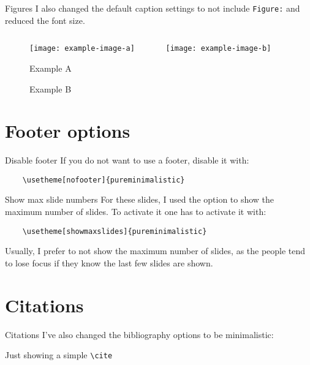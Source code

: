 \documentclass[aspectratio=169]{beamer}
\begin{document}
\begin{frame}{Figures}
  I also changed the default caption settings to not 
  include \texttt{Figure:} and reduced the font size.
    \begin{figure}[H]
        \centering
        \begin{columns}[T]
            \begin{column}{.3\linewidth}
                \texttt{[image: example-image-a]}
                \caption{Example A}
            \end{column}
            \begin{column}{.3\linewidth}
                \texttt{[image: example-image-b]}
                \caption{Example B}
            \end{column}
        \end{columns}
    \end{figure}
\end{frame}


\section{Footer options}
\begin{frame}[fragile]{Disable footer}
  If you do not want to use a footer, disable it with:
  \begin{verbatim}
    \usetheme[nofooter]{pureminimalistic}
  \end{verbatim}
\end{frame}

\begin{frame}[fragile]{Show max slide numbers}
  For these slides, I used the option to
  show the maximum number of slides. To activate it
  one has to activate it with:
  \begin{verbatim}
    \usetheme[showmaxslides]{pureminimalistic}
  \end{verbatim}
  Usually, I prefer to not show the maximum number of
  slides, as the people tend to lose focus if they know
  the last few slides are shown.
\end{frame}

\section{Citations}
\begin{frame}{Citations}
  I've also changed the bibliography options to be minimalistic:

  Just showing a simple \texttt{\textbackslash{}cite} \cite{AlexNet}
  \vfill 
  \printbibliography
\end{frame}
\end{document}
